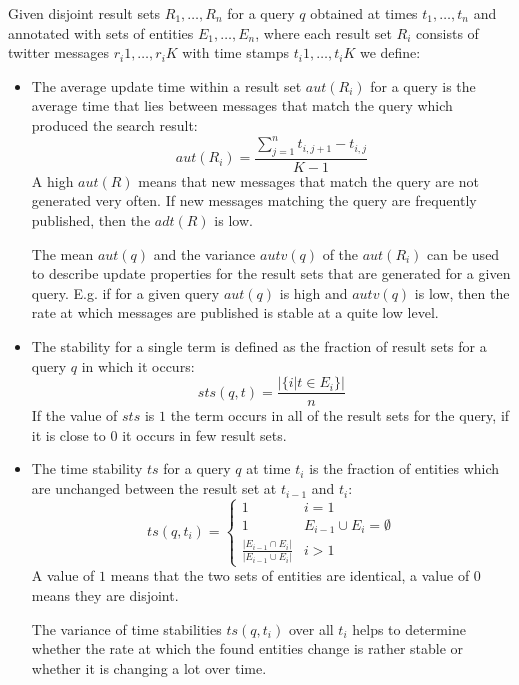 \documentclass{llncs}
\begin{document}
\begin{definition}
Given disjoint result sets $R_1,\ldots,R_n$ for a query $q$ obtained at times $t_1,\ldots,t_n$ and annotated with sets of entities $E_1,\ldots,E_n$, where each result set $R_i$ consists of twitter messages $r_i1,\ldots,r_iK$ with time stamps $t_i1,\ldots,t_iK$ we define:
\begin{itemize}
	\item The average update time within a result set $aut(R_i)$ for a query is the average time that lies between messages that match the query which produced the search result: $$aut(R_i)=\frac{\sum_{j=1}^{n}t_{i,j+1}-t_{i,j}}{K-1}$$
	A high $aut(R)$ means that new messages that match the query are not generated very often. If new messages matching the query are frequently published, then the $adt(R)$ is low.
	
	The mean $aut(q)$ and the variance $autv(q)$ of the $aut(R_i)$ can be used to describe update properties for the result sets that are generated for a given query. E.g. if for a given query $aut(q)$ is high and $autv(q)$ is low, then the rate at which messages are published is stable at a quite low level.
	\item The stability for a single term is defined as the fraction of result sets for a query $q$ in which it occurs: 
$$sts(q,t)=\frac{|\{i|t\in E_i\}|}{n}$$
	If the value of $sts$ is $1$ the term occurs in all of the result sets for the query, if it is close to $0$ it occurs in few result sets.
	\item The time stability $ts$ for a query $q$ at time $t_i$ is the fraction of
	entities which are unchanged between the result set at $t_{i-1}$ and $t_i$: 
	$$ts(q,t_i)=\begin{cases} 1 & i=1 \\
														1 & E_{i-1}\cup E_i = \emptyset\\														
														\frac{|E_{i-1}\cap E_i|}{|E_{i-1}\cup E_i|} & i>1\end{cases}$$
	A value of $1$ means that the two sets of entities are identical, a value of $0$ means they are disjoint.
	
	The variance of time stabilities $ts(q,t_i)$ over all $t_i$ helps to determine whether the rate at which the found entities change is rather stable or whether it is changing a lot over time.
\end{itemize}
\end{definition}
\end{document}
